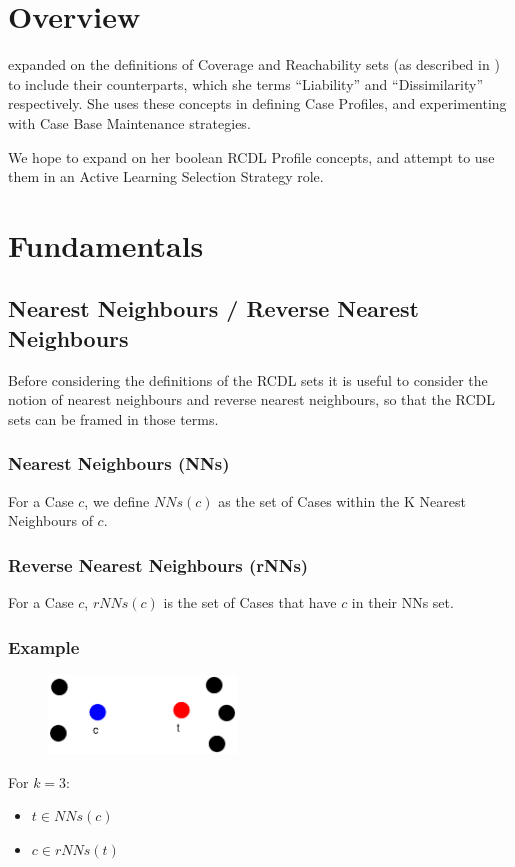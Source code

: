 \documentclass[a4paper,11pt]{report}
\begin{document}
\section{Overview}

\citet{Delany2009} expanded on the definitions of Coverage and Reachability sets (as described in \citet{Smyth1995}) to include their counterparts, which she terms ``Liability'' and ``Dissimilarity'' respectively. She uses these concepts in defining Case Profiles, and experimenting with Case Base Maintenance strategies.

We hope to expand on her boolean RCDL Profile concepts, and attempt to use them in an Active Learning Selection Strategy role.

\section{Fundamentals}
\subsection{Nearest Neighbours / Reverse Nearest Neighbours}
Before considering the definitions of the RCDL sets it is useful to consider the notion of nearest neighbours and reverse nearest neighbours, so that the RCDL sets can be framed in those terms.

\subsubsection{Nearest Neighbours (NNs)}
For a Case $c$, we define $NNs(c)$ as the set of Cases within the K Nearest Neighbours of $c$.

\subsubsection{Reverse Nearest Neighbours (rNNs)}
For a Case $c$, $rNNs(c)$ is the set of Cases that have $c$ in their NNs set.
\vspace{1em}
\begin{samepage}
\subsubsection{Example}
\begin{figure}[h!] \centering
\includegraphics[width=5cm]{./Drawn/RcdlNnRnnEg}
\end{figure}
For $k=3$:
\begin{itemize}
	\item $ t \in NNs(c) $
	\item $ c \in rNNs(t) $
\end{itemize}
\end{samepage}
\end{document}
